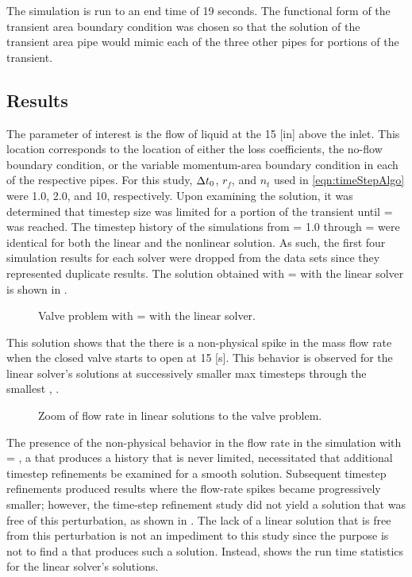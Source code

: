 The simulation is run to an end time of 19 seconds.
The functional form of the transient area boundary condition was chosen so that the solution of the transient area pipe would mimic each of the three other pipes for portions of the transient.

\subsection{Results}
\label{subsect:valveResults}

The parameter of interest is the flow of liquid at the 15 [in] above the inlet.
This location corresponds to the location of either the loss coefficients, the no-flow boundary condition, or the variable momentum-area boundary condition in each of the respective pipes.
For this study, $\dt{}_{0}$, $r_{f}$, and $n_{t}$ used in \eqref{eqn:timeStepAlgo} were 1.0, 2.0, and 10, respectively.
Upon examining the solution, it was determined that timestep size was \dtcrnt{} limited for a portion of the transient until \dtmax{} =  was reached.
The timestep history of the simulations from \dtmax{} = 1.0 through \dtmax{} =  were identical for both the linear and the nonlinear solution.
As such, the first four simulation results for each solver were dropped from the data sets since they represented duplicate results.
The solution obtained with \dtmax{} =  with the linear solver is shown in .

\begin{figure}[h!tb]
\centering

\caption{Valve problem with \dtmax{} =  with the linear solver.}
\label{fig:valveLin6pt25em02}
\end{figure}

This solution shows that the there is a non-physical spike in the mass flow rate when the closed valve starts to open at 15 [s].
This behavior is observed for the linear solver's solutions at successively smaller max timesteps through the smallest \dtmax{}, .

\begin{figure}[h!tb]
\centering

\label{fig:valveLinSols}
\caption{Zoom of flow rate in linear solutions to the valve problem.}
\end{figure}

The presence of the non-physical behavior in the flow rate in the simulation with \dtmax{} = , a \dtmax{} that produces a \dt{} history that is never \dtcrnt{} limited, necessitated that additional timestep refinements be examined for a smooth solution.
Subsequent timestep refinements produced results where the flow-rate spikes became progressively smaller; however, the time-step refinement study did not yield a solution that was free of this perturbation, as shown in .
The lack of a linear solution that is free from this perturbation is not an impediment to this study since the purpose is not to find a \dtmax{} that produces such a solution.
Instead,  shows the run time statistics for the linear solver's solutions.

